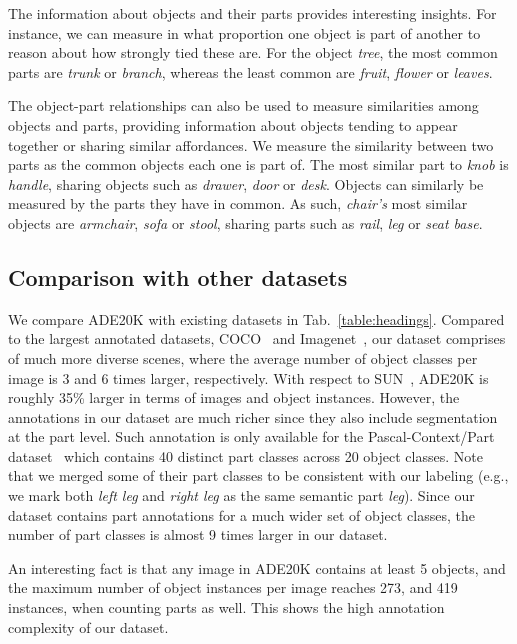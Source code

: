The information about objects and their parts provides interesting insights. For instance, we can measure in what proportion one object is part of another to reason about how strongly tied these are. For the object \textit{tree}, the most common parts are \textit{trunk} or \textit{branch}, whereas the least common are \textit{fruit}, \textit{flower} or \textit{leaves}.  

The object-part relationships can also be used to measure similarities among objects and parts, providing information about objects tending to appear together or sharing similar affordances. We measure the similarity between two parts as the common objects each one is part of. The most similar part to \textit{knob} is \textit{handle}, sharing objects such as \textit{drawer}, \textit{door} or \textit{desk}. Objects can similarly be measured by the parts they have in common. As such, \textit{chair's} most similar objects are \textit{armchair}, \textit{sofa} or \textit{stool}, sharing parts such as \textit{rail}, \textit{leg} or \textit{seat base}.

\subsection{Comparison with other datasets}
\label{sec:datasetcomparison}

We compare ADE20K with existing datasets in Tab.~\ref{table:headings}. Compared to the largest annotated datasets, COCO~\citep{lin2014microsoft} and Imagenet~\citep{ILSVRC15}, our dataset comprises of much more diverse scenes, where the average number of object classes per image is 3 and 6 times larger, respectively. With respect to SUN~\citep{xiao2010sun}, ADE20K is roughly 35\% larger  in terms of images and object instances. However, the annotations in our dataset are much richer since they also include segmentation at the part level. Such annotation is only available for the Pascal-Context/Part dataset~\citep{mottaghi2014role,chen2014parts} which contains 40 distinct part classes across 20 object classes. Note that we merged some of their part classes to be consistent with our labeling (e.g., we mark both \emph{left leg} and \emph{right leg} as the same semantic part \emph{leg}). Since our dataset contains part annotations for a much wider set of object classes, the number of part classes is almost 9 times larger in our dataset. 

An interesting fact is that any image in ADE20K contains at least 5 objects, and the maximum number of object instances per image reaches 273, and 419 instances, when counting parts as well. This shows the high annotation complexity of our dataset.

